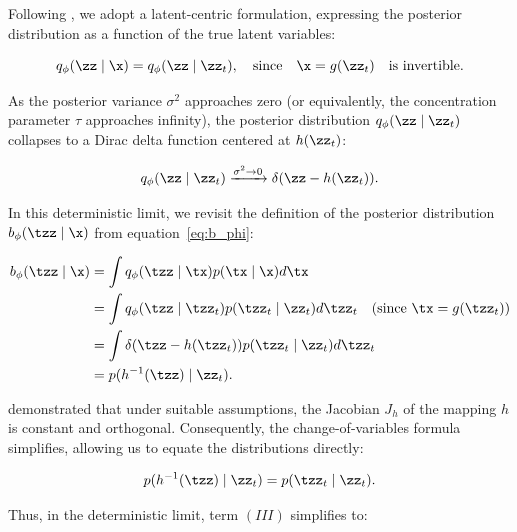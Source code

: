 Following \citet{Zimmermann2021-ax}, we adopt a latent-centric formulation, expressing the posterior distribution as a function of the true latent variables:

\begin{equation}
    q_{\phi}(\zz \mid \x) = q_{\phi}(\zz \mid \zz_t), \quad \text{since} \quad \x = g(\zz_t) \quad \text{is invertible.}
\end{equation}

As the posterior variance $\sigma^2$ approaches zero (or equivalently, the concentration parameter $\tau$ approaches infinity), the posterior distribution $q_{\phi}(\zz \mid \zz_t)$ collapses to a Dirac delta function centered at $h(\zz_t)$:

\begin{equation}
    q_{\phi}(\zz \mid \zz_t) \xrightarrow{\sigma^2 \to 0} \delta(\zz - h(\zz_t)).
\end{equation}

In this deterministic limit, we revisit the definition of the posterior distribution $b_{\phi}(\tzz \mid \x)$ from equation~\eqref{eq:b_phi}:

\begin{align}
    b_{\phi}(\tzz \mid \x) & = \int q_{\phi}(\tzz \mid \tx) p(\tx \mid \x) d\tx                                                   \\
                           & = \int q_{\phi}(\tzz \mid \tzz_t) p(\tzz_t \mid \zz_t) d\tzz_t \quad (\text{since } \tx = g(\tzz_t)) \\
                           & = \int \delta(\tzz - h(\tzz_t)) p(\tzz_t \mid \zz_t) d\tzz_t                                         \\
                           & = p(h^{-1}(\tzz) \mid \zz_t).
\end{align}

\citep{Zimmermann2021-ax} demonstrated that under suitable assumptions, the Jacobian $J_h$ of the mapping $h$ is constant and orthogonal. Consequently, the change-of-variables formula simplifies, allowing us to equate the distributions directly:

\begin{equation}
    p(h^{-1}(\tzz) \mid \zz_t) = p(\tzz_t \mid \zz_t).
\end{equation}

Thus, in the deterministic limit, term $(III)$ simplifies to:

